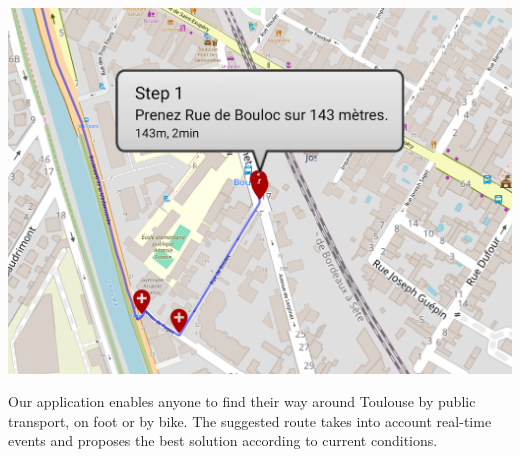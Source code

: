 \begin{center}
\includegraphics[scale=0.30]{content/step_cut.png}    
\end{center}



Our application enables anyone to find their way around Toulouse by public transport, on foot or by bike. The suggested route takes into account real-time events and proposes the best solution according to current conditions.
